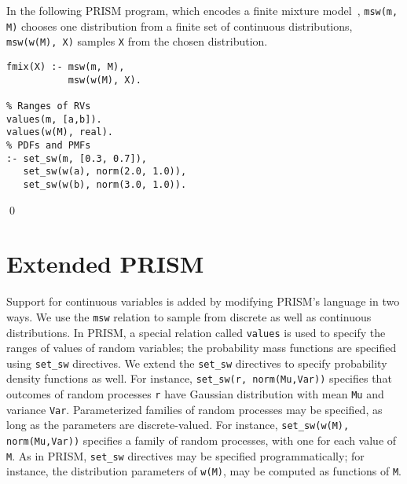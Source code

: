 \begin{Ex}
In the following PRISM program, which encodes a finite mixture model~\cite{fmm},
{\rm \texttt{msw(m, M)}} chooses one distribution from a finite set of
continuous 
distributions, {\rm \texttt{msw(w(M), X)}} samples {\rm \texttt{X}} from the chosen distribution.

\begin{small}
  \begin{minipage}{3.0in}
\begin{verbatim}
fmix(X) :- msw(m, M),
           msw(w(M), X).

% Ranges of RVs
values(m, [a,b]).
values(w(M), real).
% PDFs and PMFs
:- set_sw(m, [0.3, 0.7]),
   set_sw(w(a), norm(2.0, 1.0)),
   set_sw(w(b), norm(3.0, 1.0)).
\end{verbatim}
\end{minipage}
\end{small}
\qed
  \label{ex:fmm}
\end{Ex}


\section{Extended PRISM}
\label{sec:language}

Support for continuous variables is added by modifying PRISM's
language in two ways.   We use the \texttt{msw}
relation to sample from discrete as well as continuous distributions.
In PRISM, a special relation
called \texttt{values} is used to specify the ranges of values of
random variables; the probability mass functions are specified using
\texttt{set\_sw} directives.  We extend the
\texttt{set\_sw} directives to specify probability density functions
as well.  For instance, \texttt{set\_sw(r, norm(Mu,Var))} specifies
that outcomes of  random processes \texttt{r} have Gaussian
distribution with mean 
\texttt{Mu} and variance \texttt{Var}.
  Parameterized families of random
processes may be specified, as long as the parameters are
discrete-valued.  For 
instance, \texttt{set\_sw(w(M), norm(Mu,Var))} specifies a family of
random processes, with one for each value of \texttt{M}. As
in PRISM, \texttt{set\_sw} directives may be specified
programmatically; for instance, the distribution parameters of \texttt{w(M)},
 may be computed as functions of
\texttt{M}.

